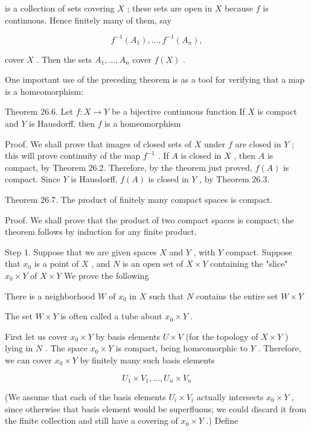 is a collection of sets covering \(X\) ; these sets are open in \(X\) because \(f\) is continuous. Hence finitely many of them, say

\[
{f}^{-1}\left( {A}_{1}\right) ,\ldots ,{f}^{-1}\left( {A}_{n}\right) ,
\]

cover \(X\) . Then the sets \({A}_{1},\ldots ,{A}_{n}\) cover \(f\left( X\right)\) .

One important use of the preceding theorem is as a tool for verifying that a map is a homeomorphism:

Theorem 26.6. Let \(f : X \rightarrow  Y\) be a bijective continuous function If \(X\) is compact and \(Y\) is Hausdorff, then \(f\) is a homeomorphism

Proof. We shall prove that images of closed sets of \(X\) under \(f\) are closed in \(Y\) ; this will prove continuity of the map \({f}^{-1}\) . If \(A\) is closed in \(X\) , then \(A\) is compact, by Theorem 26.2. Therefore, by the theorem just proved, \(f\left( A\right)\) is compact. Since \(Y\) is Hausdorff, \(f\left( A\right)\) is closed in \(Y\) , by Theorem 26.3.

Theorem 26.7. The product of finitely many compact spaces is compact.

Proof. We shall prove that the product of two compact spaces is compact; the theorem follows by induction for any finite product.

Step 1. Suppose that we are given spaces \(X\) and \(Y\) , with \(Y\) compact. Suppose that \({x}_{0}\) is a point of \(X\) , and \(N\) is an open set of \(X \times  Y\) containing the "slice" \({x}_{0} \times  Y\) of \(X \times  Y\) We prove the following

There is a neighborhood \(W\) of \({x}_{0}\) in \(X\) such that \(N\) contains the entire set \(W \times  Y\)

The set \(W \times  Y\) is often called a tube about \({x}_{0} \times  Y\) .

First let us cover \({x}_{0} \times  Y\) by basis elements \(U \times  V\) (for the topology of \(X \times  Y\) ) lying in \(N\) . The space \({x}_{0} \times  Y\) is compact, being homeomorphic to \(Y\) . Therefore, we can cover \({x}_{0} \times  Y\) by finitely many such basis elements

\[
{U}_{1} \times  {V}_{1},\ldots ,{U}_{n} \times  {V}_{n}
\]

(We assume that each of the basis elements \({U}_{i} \times  {V}_{i}\) actually intersects \({x}_{0} \times  Y\) , since otherwise that basis element would be superfluous; we could discard it from the finite collection and still have a covering of \({x}_{0} \times  Y\) .) Define

